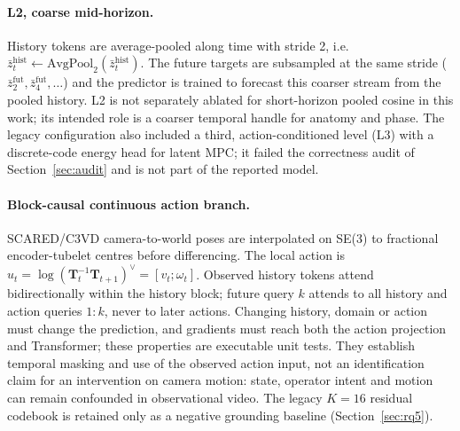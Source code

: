 \documentclass[preprint,12pt]{elsarticle}
\begin{document}
\paragraph{L2, coarse mid-horizon.}
History tokens are average-pooled along time with stride 2, i.e.
$\bar z^{\mathrm{hist}}_t\leftarrow\mathrm{AvgPool}_2(\bar z^{\mathrm{hist}}_t)$.
The future targets are subsampled at the same stride
($\bar z^{\mathrm{fut}}_{2}, \bar z^{\mathrm{fut}}_{4}, \ldots$) and the
predictor is trained to forecast this coarser stream from the pooled history.
L2 is not separately ablated for short-horizon pooled cosine in this work; its
intended role is a coarser temporal handle for anatomy and phase.
The legacy configuration also included a third, action-conditioned level (L3)
with a discrete-code energy head for latent MPC; it failed the correctness
audit of Section~\ref{sec:audit} and is not part of the reported model.

\paragraph{Block-causal continuous action branch.}
SCARED/C3VD camera-to-world poses are interpolated on SE(3) to fractional
encoder-tubelet centres before differencing. The local action is
$u_t=\log(\mathbf{T}_t^{-1}\mathbf{T}_{t+1})^\vee=[v_t;\omega_t]$. Observed history tokens attend
bidirectionally within the history block; future query $k$ attends to all
history and action queries $1{:}k$, never to later actions. Changing history,
domain or action must change the prediction, and gradients must reach both the
action projection and Transformer; these properties are executable unit tests.
They establish temporal masking and use of the observed action input, not an
identification claim for an intervention on camera motion: state, operator
intent and motion can remain confounded in observational video.
The legacy $K{=}16$ residual codebook is retained only as a negative grounding
baseline (Section~\ref{sec:rq5}).
\end{document}
